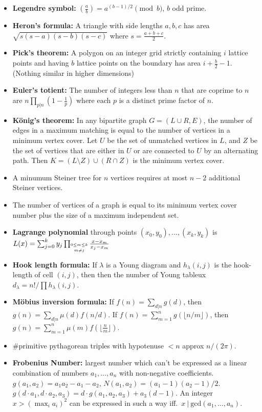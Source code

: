   \begin{itemize}[leftmargin=*]
    \item \textbf{Legendre symbol:} $\left(\frac{a}{b}\right) = a^{(b-1)/2} \pmod{b}$, $b$ odd prime.
    \item \textbf{Heron's formula:} A triangle with side lengths
      $a,b,c$ has area $\sqrt{s(s-a)(s-b)(s-c)}$ where $s =
      \frac{a+b+c}{2}$.
    \item \textbf{Pick's theorem:} A polygon on an integer grid
      strictly containing $i$ lattice points and having $b$ lattice
      points on the boundary has area $i + \frac{b}{2} - 1$. (Nothing
      similar in higher dimensions)
    \item \textbf{Euler's totient:} The number of integers less than
      $n$ that are coprime to $n$ are $n\prod_{p|n}\left(1 - \frac{1}{p}\right)$
      where each $p$ is a distinct prime factor of $n$.
    \item \textbf{König's theorem:} In any bipartite graph $G=(L\cup R,E)$, the number
      of edges in a maximum matching is equal to the number of
      vertices in a minimum vertex cover. Let $U$ be the set of
      unmatched vertices in $L$, and $Z$ be the set of vertices that
      are either in $U$ or are connected to $U$ by an alternating
      path. Then $K=(L\setminus Z)\cup(R\cap Z)$ is the minimum
      vertex cover.
    \item A minumum Steiner tree for $n$ vertices requires at most $n-2$ additional Steiner vertices.
    \item The number of vertices of a graph is equal to its minimum
      vertex cover number plus the size of a maximum independent set.
    \item \textbf{Lagrange polynomial} through points $(x_0,y_0),\ldots,(x_k,y_k)$ is $L(x) = \sum_{j=0}^k y_j \prod_{\shortstack{$\scriptscriptstyle 0\leq m \leq k$ \\ $\scriptscriptstyle m\neq j$}} \frac{x-x_m}{x_j - x_m}$
    \item \textbf{Hook length formula:} If $\lambda$ is a Young diagram and $h_{\lambda}(i,j)$ is the hook-length of cell $(i,j)$, then then the number of Young tableux $d_{\lambda} = n!/\prod h_{\lambda}(i,j)$.
    \item \textbf{Möbius inversion formula:} If $f(n) = \sum_{d|n} g(d)$, then $g(n) = \sum_{d|n} \mu(d) f(n/d)$. If $f(n) = \sum_{m=1}^n g(\lfloor n/m\rfloor)$, then $g(n) = \sum_{m=1}^n \mu(m)f(\lfloor\frac{n}{m}\rfloor)$.
    \item \#primitive pythagorean triples with hypotenuse $<n$ approx $n/(2\pi)$.
    \item \textbf{Frobenius Number:} largest number which can't be
      expressed as a linear combination of numbers $a_1,\ldots,a_n$
      with non-negative coefficients. $g(a_1,a_2) = a_1a_2-a_1-a_2$,
      $N(a_1,a_2)=(a_1-1)(a_2-1)/2$. $g(d\cdot a_1,d\cdot a_2,a_3) =
      d\cdot g(a_1,a_2,a_3) + a_3(d-1)$. An integer $x>\left(\max_i
      a_i\right)^2$ can be expressed in such a way iff.\ $x\ |\
      \mathrm{gcd}(a_1,\ldots,a_n)$.
  \end{itemize}

